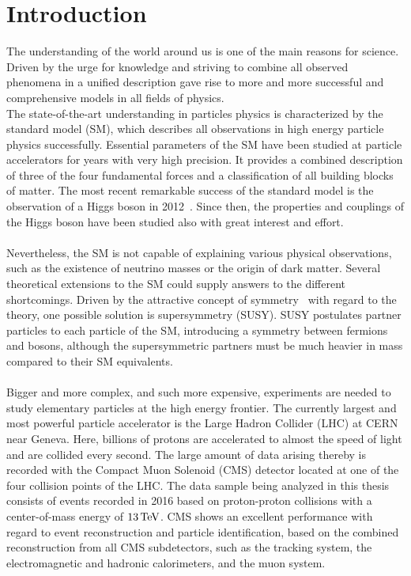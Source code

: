 \chapter{Introduction}\label{chap:intro}

The understanding of the world around us is one of the main reasons for science. Driven by the urge for knowledge and striving to combine all observed phenomena in a unified description gave rise to more and more successful and comprehensive models in all fields of physics.\\
The state-of-the-art understanding in particles physics is characterized by the standard model (SM), which describes all observations in high energy particle physics successfully. Essential parameters of the SM have been studied at particle accelerators for years with very high precision. It provides a combined description of three of the four fundamental forces and a classification of all building blocks of matter. The most recent remarkable success of the standard model is the observation of a Higgs boson in 2012~\cite{HiggsCMS,HiggsATLAS,HiggsCombined}. Since then, the properties and couplings of the Higgs boson have been studied also with great interest and effort.\\\\
Nevertheless, the SM is not capable of explaining various physical observations, such as the existence of neutrino masses or the origin of dark matter. Several theoretical extensions to the SM could supply answers to the different shortcomings. Driven by the attractive concept of symmetry~\cite{Noether} with regard to the theory, one possible solution is supersymmetry (SUSY). SUSY postulates partner particles to each particle of the SM, introducing a symmetry between fermions and bosons, although the supersymmetric partners must be much heavier in mass compared to their SM equivalents.\\\\
Bigger and more complex, and such more expensive, experiments are needed to study elementary particles at the high energy frontier. The currently largest and most powerful particle accelerator is the Large Hadron Collider (LHC) at CERN near Geneva. Here, billions of protons are accelerated to almost the speed of light and are collided every second. The large amount of data arising thereby is recorded with the Compact Muon Solenoid (CMS) detector located at one of the four collision points of the LHC. The data sample being analyzed in this thesis consists of events recorded in 2016 based on proton-proton collisions with a center-of-mass energy of $13\,\text{Te\hspace{-.08em}V}$. CMS shows an excellent performance with regard to event reconstruction and particle identification, based on the combined reconstruction from all CMS subdetectors, such as the tracking system, the electromagnetic and hadronic calorimeters, and the muon system.\\\\
